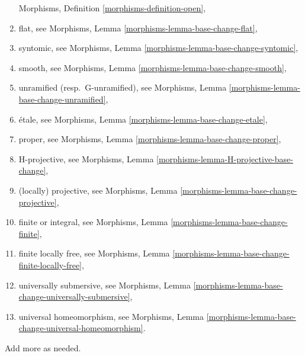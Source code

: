 \begin{remark}
\begin{enumerate}
Morphisms, Definition \ref{morphisms-definition-open},
\item flat, see
Morphisms, Lemma \ref{morphisms-lemma-base-change-flat},
\item syntomic, see
Morphisms, Lemma \ref{morphisms-lemma-base-change-syntomic},
\item smooth, see
Morphisms, Lemma \ref{morphisms-lemma-base-change-smooth},
\item unramified (resp.\ G-unramified), see
Morphisms, Lemma \ref{morphisms-lemma-base-change-unramified},
\item \'etale, see
Morphisms, Lemma \ref{morphisms-lemma-base-change-etale},
\item proper, see
Morphisms, Lemma \ref{morphisms-lemma-base-change-proper},
\item H-projective, see
Morphisms, Lemma \ref{morphisms-lemma-H-projective-base-change},
\item (locally) projective, see
Morphisms, Lemma \ref{morphisms-lemma-base-change-projective},
\item finite or integral, see
Morphisms, Lemma \ref{morphisms-lemma-base-change-finite},
\item finite locally free, see
Morphisms, Lemma \ref{morphisms-lemma-base-change-finite-locally-free},
\item universally submersive, see
Morphisms, Lemma \ref{morphisms-lemma-base-change-universally-submersive},
\item universal homeomorphism, see
Morphisms, Lemma \ref{morphisms-lemma-base-change-universal-homeomorphism}.
\end{enumerate}
Add more as needed.
\end{remark}

